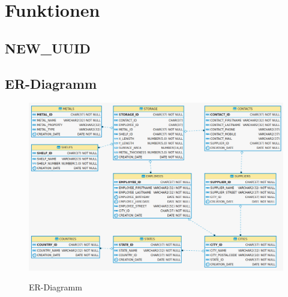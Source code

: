 \appendix
\section{Funktionen}
\label{app:funktionen}

\subsection{NEW\_UUID}
\label{app:funktionen.new_uuid}


\newpage

\begin{landscape}
  \section{ER-Diagramm}
  \label{app:er-diagramm}

  \begin{figure}[h]
    \centering
    \includegraphics[width=1.05\textwidth]{img//er-diagramm.png}
    \label{img:er-diagramm}
    \caption{ER-Diagramm}
  \end{figure}
\end{landscape}

